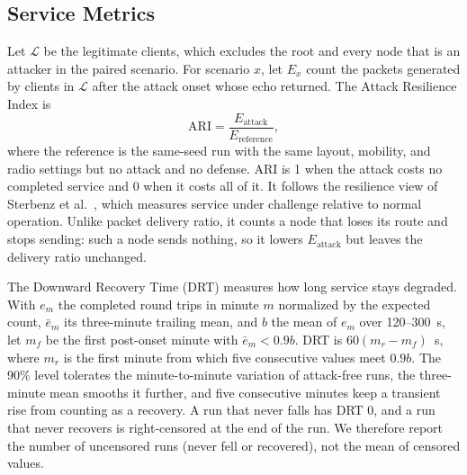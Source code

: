 \subsection{Service Metrics}
Let $\mathcal{L}$ be the legitimate clients, which excludes the root and every node that is an attacker in the paired scenario. For scenario $x$, let $E_x$ count the packets generated by clients in $\mathcal{L}$ after the attack onset whose echo returned. The Attack Resilience Index is
\begin{equation}
 \mathrm{ARI}=\frac{E_{\mathrm{attack}}}{E_{\mathrm{reference}}},
 \label{eq:ari}
\end{equation}
where the reference is the same-seed run with the same layout, mobility, and radio settings but no attack and no defense. ARI is 1 when the attack costs no completed service and 0 when it costs all of it. It follows the resilience view of Sterbenz et al.\ \cite{sterbenz2013}, which measures service under challenge relative to normal operation. Unlike packet delivery ratio, it counts a node that loses its route and stops sending: such a node sends nothing, so it lowers $E_{\mathrm{attack}}$ but leaves the delivery ratio unchanged.

The Downward Recovery Time (DRT) measures how long service stays degraded. With $e_m$ the completed round trips in minute $m$ normalized by the expected count, $\bar e_m$ its three-minute trailing mean, and $b$ the mean of $e_m$ over 120--300~s, let $m_f$ be the first post-onset minute with $\bar e_m<0.9b$. DRT is $60(m_r-m_f)$~s, where $m_r$ is the first minute from which five consecutive values meet $0.9b$. The 90\% level tolerates the minute-to-minute variation of attack-free runs, the three-minute mean smooths it further, and five consecutive minutes keep a transient rise from counting as a recovery. A run that never falls has DRT 0, and a run that never recovers is right-censored at the end of the run. We therefore report the number of uncensored runs (never fell or recovered), not the mean of censored values.
